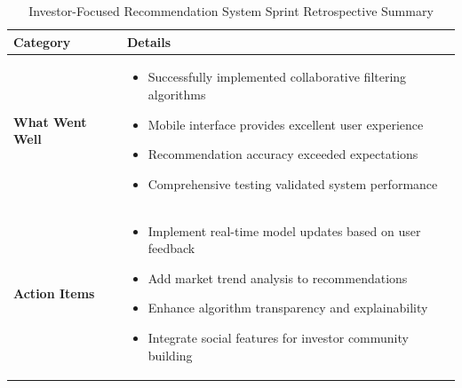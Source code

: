 \begin{table}[htbp]
    \centering
    \begin{tabular}{|p{3cm}|p{10cm}|}
        \hline
        \textbf{Category} & \textbf{Details} \\
        \hline
        \textbf{What Went Well} & 
        \begin{itemize}
            \item Successfully implemented collaborative filtering algorithms
            \item Mobile interface provides excellent user experience
            \item Recommendation accuracy exceeded expectations
            \item Comprehensive testing validated system performance
        \end{itemize} \\
        \hline
        \textbf{Action Items} & 
        \begin{itemize}
            \item Implement real-time model updates based on user feedback
            \item Add market trend analysis to recommendations
            \item Enhance algorithm transparency and explainability
            \item Integrate social features for investor community building
        \end{itemize} \\
        \hline
    \end{tabular}
    \caption{Investor-Focused Recommendation System Sprint Retrospective Summary}
    \label{tab:recommendation-retrospective}
\end{table}





